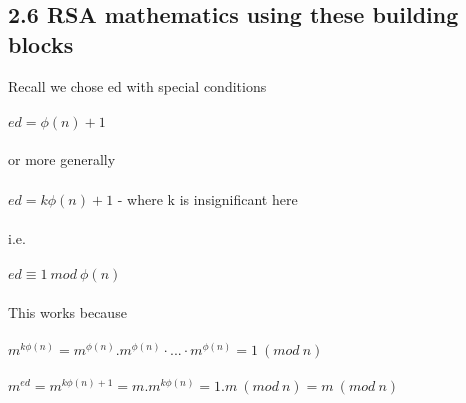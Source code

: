 \documentclass[11pt]{article}   	%
\begin{document}
\subsection*{2.6 RSA mathematics using these building blocks}

Recall we chose ed with special conditions \\
\\
$ ed = \phi(n) + 1 $ \\
\\
or more generally \\
\\
$ ed = k\phi(n) + 1 $ - where k is insignificant here \\
\\
i.e. \\
\\
$ ed \equiv 1 \  mod \ \phi(n) $ \\
\\
This works because \\
\\
$ m^{k \phi(n)} = m^{\phi(n)} . m^{\phi(n)} · . . . · m^{\phi(n)} = 1 \ (mod \ n) $ \\
\\
$ m^{ed} = m^{k\phi(n) + 1} = m . m^{k \phi(n)} = 1.m \ (mod \ n) = m \ (mod \ n) $ \\
\end{document}
